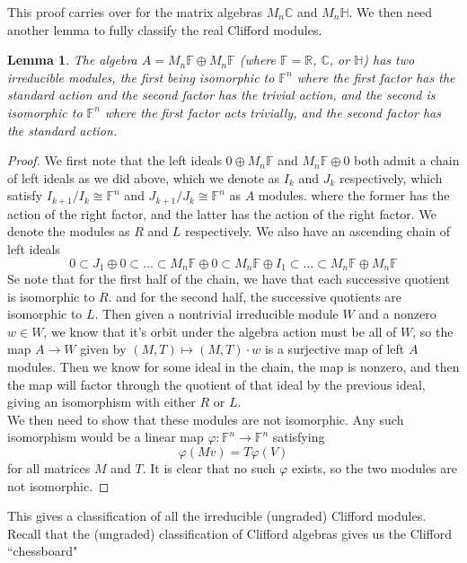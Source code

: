 \documentclass[psamsfonts]{amsart}
\newtheorem{lem}[thm]{Lemma}
\theoremstyle{definition}
\theoremstyle{remark}
\newcommand{\R}{\mathbb{R}}
\renewcommand{\H}{\mathbb{H}}
\newcommand{\C}{\mathbb{C}}
\newcommand{\F}{\mathbb{F}}
\begin{document}
%
This proof carries over for the matrix algebras $M_n\C$ and $M_n\H$. We then need another lemma to fully classify the real Clifford modules.
\begin{lem}
The algebra $A = M_n\F \oplus M_n\F$ (where $\F = \R$, $\C$, or $\H$) has two irreducible modules, the first being isomorphic to $\F^n$ where the first factor has the standard action and the second factor has the trivial action, and the second is isomorphic to $\F^n$ where the first factor acts trivially, and the second factor has the standard action.
\end{lem}
%
\begin{proof}
We first note that the left ideals $0 \oplus M_n\F$ and $M_n\F \oplus 0$ both admit a chain of left ideals as we did above, which we denote as $I_k$ and $J_k$ respectively, which satisfy $I_{k+1} / I_k \cong \F^n$ and $J_{k+1} / J_k \cong \F^n$ as $A$ modules. where the former has the action of the right factor, and the latter has the action of the right factor. We denote the modules as $R$ and $L$ respectively. We also have an ascending chain of left ideals
\[
0 \subset J_1 \oplus 0 \subset \ldots \subset M_n\F \oplus 0 \subset M_n\F \oplus I_1 \subset \ldots \subset M_n\F \oplus M_n\F
\]
Se note that for the first half of the chain, we have that each successive quotient is isomorphic to $R$. and for the second half, the successive quotients are isomorphic to $L$. Then given a nontrivial irreducible module $W$ and a nonzero $w \in W$, we know that it's orbit under the algebra action must be all of $W$, so the map $A \to W$ given by $(M,T) \mapsto (M,T) \cdot w$ is a surjective map of left $A$ modules. Then we know for some ideal in the chain, the map is nonzero, and then the map will factor through the quotient of that ideal by the previous ideal, giving an isomorphism with either $R$ or $L$.\\

We then need to show that these modules are not isomorphic. Any such isomorphism would be a linear map $\varphi : \F^n \to \F^n$ satisfying
\[
\varphi(Mv) = T\varphi(V)
\]
for all matrices $M$ and $T$. It is clear that no such $\varphi$ exists, so the two modules are not isomorphic.
\end{proof}
%
This gives a classification of all the irreducible (ungraded) Clifford modules. Recall that the (ungraded) classification of Clifford algebras gives us the Clifford ``chessboard" \\\\
%
\end{document}
